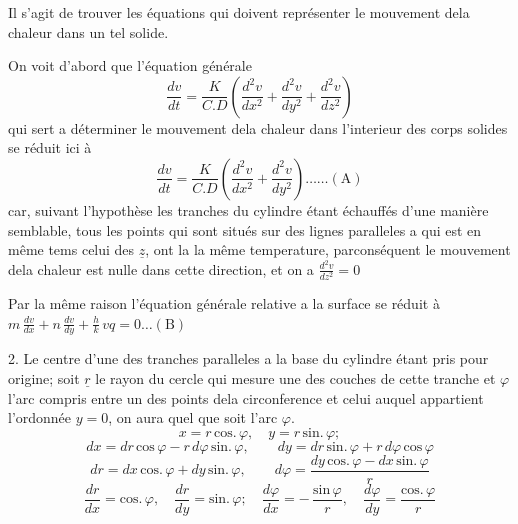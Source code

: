 \documentclass[11pt,a4paper]{article}
\begin{document}
Il s'agit de trouver les équations qui doivent représenter
le mouvement dela chaleur dans un tel solide.

On voit d'abord que l'équation générale
\[ \frac{dv}{dt} = \frac{K}{C.D}\left(\frac{d^{2}v}{dx^{2}} + \frac{d^{2}v}{dy^{2}} + \frac{d^{2}v}{dz^{2}}\right) \]
qui sert a déterminer le mouvement dela chaleur
dans l'interieur des corps solides se réduit ici à
\[ \frac{dv}{dt} = \frac{K}{C.D}\left(\frac{d^{2}v}{dx^{2}} + \frac{d^{2}v}{dy^{2}}\right) \ldots\ldots (\text{A}) \]
car, suivant l'hypothèse les tranches du cylindre
étant échauffés d'une manière semblable, tous les points
qui sont situés sur des lignes paralleles a   qui est en même tems celui des $\underline{z}$, ont la
la même temperature, parconséquent le mouvement
dela chaleur est nulle dans cette direction, et on
a \quad $\frac{d^{2}v}{dz^{2}} = 0$

Par la même raison l'équation générale relative a la
surface se réduit à \qquad $m\,\frac{dv}{dx} + n\,\frac{dv}{dy} + \frac{h}{k}\,vq = 0 \ldots (\text{B})$



2. Le centre d'une des tranches paralleles a la base du
cylindre étant pris pour origine; soit $\underline{r}$ le rayon du
cercle qui mesure une des couches de cette tranche et $\varphi$
l'arc compris entre un des points dela circonference
et celui auquel appartient l'ordonnée $y = 0$, on aura
quel que soit l'arc $\varphi$.
\[ x = r\,\text{cos.}\,\varphi,\quad y = r\,\text{sin.}\,\varphi; \]
\[ dx = dr\,\text{cos}\,\varphi - r\,d\varphi\,\text{sin.}\,\varphi,\qquad dy = dr\,\text{sin.}\,\varphi + r\,d\varphi\,\text{cos}\,\varphi \]
\[ dr = dx\,\text{cos.}\,\varphi + dy\,\text{sin.}\,\varphi,\qquad d\varphi = \frac{dy\,\text{cos.}\,\varphi - dx\,\text{sin.}\,\varphi}{r} \]
\[ \frac{dr}{dx} = \text{cos.}\,\varphi,\quad \frac{dr}{dy} = \text{sin.}\,\varphi;\quad \frac{d\varphi}{dx} = -\,\frac{\text{sin}\,\varphi}{r},\quad \frac{d\varphi}{dy} = \frac{\text{cos.}\,\varphi}{r} \]
\end{document}
